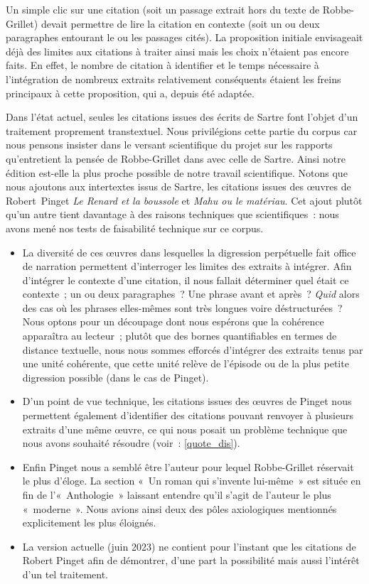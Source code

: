 \documentclass[12pt, a4paper]{article}
\begin{document}
Un simple clic sur une citation (soit un passage extrait hors du texte de Robbe-Grillet) devait permettre de lire la citation en contexte (soit un ou deux paragraphes entourant le ou les passages cités). La proposition initiale envisageait déjà des limites aux citations à traiter ainsi mais les choix n'étaient pas encore faits. En effet, le nombre de citation à identifier et le temps nécessaire à l'intégration de nombreux extraits relativement conséquents étaient les freins principaux à cette proposition, qui a, depuis été adaptée.


Dans l'état actuel, seules les citations issues des écrits de Sartre font l'objet d'un traitement proprement transtextuel. Nous privilégions cette partie du corpus car nous pensons insister dans le versant scientifique du projet sur les rapports qu'entretient la pensée de Robbe-Grillet dans \punr{} avec celle de Sartre. Ainsi notre édition est-elle la plus proche possible de notre travail scientifique. %
Notons que nous ajoutons aux intertextes issus de Sartre, les citations issues des œuvres de Robert~Pinget \textit{Le Renard et la boussole} et \textit{Mahu ou le matériau}. Cet ajout plutôt qu'un autre tient davantage à des raisons techniques que scientifiques~: nous avons mené nos tests de faisabilité technique sur ce corpus.
\begin{itemize}
    \item La diversité de ces œuvres dans lesquelles la digression perpétuelle fait office de narration permettent d'interroger les limites des extraits à intégrer. Afin d'intégrer le contexte d'une citation, il nous fallait déterminer quel était ce contexte~; un ou deux paragraphes~? Une phrase avant et après~? \textit{Quid} alors des cas où les phrases elles-mêmes sont très longues voire déstructurées~? Nous optons pour un découpage dont nous espérons que la cohérence apparaîtra au lecteur~; plutôt que des bornes quantifiables en termes de distance textuelle, nous nous sommes efforcés d'intégrer des extraits tenus par une unité cohérente, que cette unité relève de l'épisode ou de la plus petite digression possible (dans le cas de Pinget).
    \item D'un point de vue technique, les citations issues des œuvres de Pinget nous permettent également d'identifier des citations pouvant renvoyer à plusieurs extraits d'une même œuvre, ce qui nous posait un problème technique que nous avons souhaité résoudre (voir~: \ref{quote_dis}).
    \item Enfin Pinget nous a semblé être l'auteur pour lequel Robbe-Grillet réservait le plus d'éloge. La section «~Un roman qui s'invente lui-même~» est située en fin de l'«~Anthologie~» laissant entendre qu'il s'agit de l'auteur le plus «~moderne~».
    Nous avions ainsi deux des pôles axiologiques mentionnés explicitement les plus éloignés.
    \item La version actuelle (juin 2023) ne contient pour l'instant que les citations de Robert Pinget afin de démontrer, d'une part la possibilité mais aussi l'intérêt d'un tel traitement.
\end{itemize}
\end{document}
